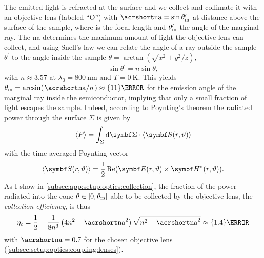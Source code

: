 The emitted light is refracted at the surface and we collect and collimate it with an objective lens (labeled \enquote{O}) with $\NA=\sin\theta^\prime_\mr{m}$ at distance \fob above the surface of the sample, where \fob is the focal length and $\theta^\prime_{\mathrm{m}}$ the angle of the marginal ray.
The \gls{na} determines the maximum amount of light the objective lens can collect, and using Snell's law we can relate the angle of a ray outside the sample $\theta^\prime$ to the angle inside the sample $\theta = \arctan(\sqrt{x^2 + y^2}/z)$,
\begin{equation}\label{eq:setup:optics:coupling:snell}
    \sin\theta^\prime = n\sin\theta,
\end{equation}
with $n\approx 3.57$ at $\lambda_0=\qty{800}{\nano\meter}$ and $T=\qty{0}{\kelvin}$.
This yields $\theta_{\mr{m}} = \arcsin(\flatfrac{\NA}{n}) \approx\qty{11}{\degree}$ for the emission angle of the marginal ray inside the semiconductor, implying that only a small fraction of light escapes the sample.
Indeed, according to Poynting's theorem the radiated power through the surface $\Sigma$ is given by
\begin{equation}\label{eq:setup:optics:coupling:power}
    \expval{P} = \int_{\Sigma}\dd{\bvec{\Sigma}}\cdot\expval{\bvec{S}(r, \vartheta)}
\end{equation}
with the time-averaged Poynting vector
\begin{equation}\label{eq:setup:optics:coupling:poynting}
    \expval{\bvec{S}(r, \vartheta)} = \frac{1}{2}\re(\bvec{E}(r, \vartheta)\times\bvec{H}^{\ast}(r, \vartheta)).
\end{equation}
As I show in \cref{subsec:app:setup:optics:collection}, the fraction of the power radiated into the cone $\theta\in[0, \theta_{\mathrm{m}}]$ able to be collected by the objective lens, the \emph{collection efficiency}, is thus
\begin{equation}\label{eq:setup:optics:coupling:efficiency:collection}
    \eta_{\mr{c}} = \frac{1}{2} - \frac{1}{8 n^3}\left(4n^2 - \NA^2\right)\sqrt{n^2 - \NA^2} \approx \qty{1.4}{\percent}
\end{equation}
with $\NA=\num{0.7}$ for the chosen objective lens (\cf \cref{subsec:setup:optics:coupling:lenses}).

